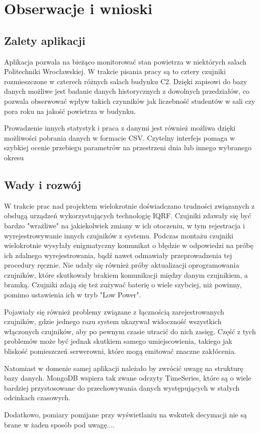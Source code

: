 \section{Obserwacje i wnioski}

\subsection{Zalety aplikacji}

Aplikacja pozwala na bieżąco monitorować stan powietrza w niektórych salach Politechniki Wrocławskiej. W trakcie pisania pracy są to
cztery czujniki rozmieszczone w czterech różnych salach budynku C2. Dzięki zapisowi do bazy danych możliwe jest badanie danych historycznych z dowolnych
przedziałów, co pozwala obserwować wpływ takich czynników jak liczebność studentów w sali czy pora roku na jakość powietrza w budynku.

Prowadzenie innych statystyk i praca z danymi jest również możliwa dzięki możliwości pobrania danych w formacie CSV. Czytelny interfejs pomaga w 
szybkiej ocenie przebiegu parametrów na przestrzeni dnia lub innego wybranego okresu

\subsection{Wady i rozwój}

W trakcie prac nad projektem wielokrotnie doświadczano trudności związanych z obsługą urządzeń wykorzystujących technologię IQRF. Czujniki zdawały się
być bardzo "wrażliwe" na jakiekolwiek zmiany w ich otoczeniu, w tym rejestracja i wyrejestrowywanie innych czujników z systemu. Podczas montażu
czujniki wielokrotnie wysyłały enigmatyczny komunikat o błędzie w odpowiedzi na próbę ich zdalnego wyrejestrowania, bądź nawet odmawiały
przeprowadzenia tej procedury ręcznie. 
Nie udały się również próby aktualizacji oprogramowania czujników, które skutkowały brakiem komunikacji między danym czujnikiem, a bramką. 
Czujniki zdają się też zużywać baterię o wiele szybciej, niż powinny, pomimo ustawienia ich w tryb "Low Power".

Pojawiały się również problemy związane z łącznością zarejestrowanych czujników, gdzie jednego razu system ukazywał widoczność wszystkich włączonych
czujników, aby po pewnym czasie utracić do nich zasięg. Część z tych problemów może być jednak skutkiem samego umiejscowienia, takiego jak bliskość 
pomieszczeń serwerowni, które mogą emitować znaczne zakłócenia.

Natomiast w domenie samej aplikacji należało by zwrócić uwagę na strukturę bazy danych. MongoDB wspiera tak zwane odczyty TimeSeries, które są o wiele
bardziej przystosowane do przechowywania danych występujących w stałych odcinkach czasowych.

Dodatkowo, pomiary pomijane przy wyświetlaniu na wskutek decymacji nie są brane w żaden sposób pod uwagę....